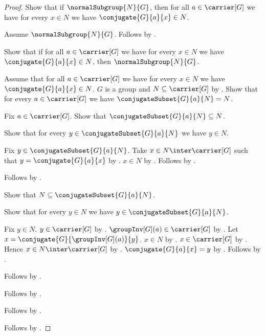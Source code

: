 \begin{proof}
    Show that if $\normalSubgroup{N}{G}$, then
        for all $a\in\carrier[G]$ we have for every $x\in N$ we have
            $\conjugate{G}{a}{x}\in N$.
    \begin{subproof}
        Assume $\normalSubgroup{N}{G}$.
        Follows by .
    \end{subproof}
    Show that if for all $a\in\carrier[G]$ we have for every $x\in N$
        we have $\conjugate{G}{a}{x}\in N$, then
        $\normalSubgroup{N}{G}$.
    \begin{subproof}
        Assume that for all $a\in\carrier[G]$ we have for every $x\in N$
            we have $\conjugate{G}{a}{x}\in N$.
        $G$ is a group and $N\subseteq\carrier[G]$ by
            .
        Show that for every $a\in\carrier[G]$ we have
            $\conjugateSubset{G}{a}{N}=N$.
        \begin{subproof}
            Fix $a\in\carrier[G]$.
            Show that $\conjugateSubset{G}{a}{N}\subseteq N$.
            \begin{subproof}
                Show that for every $y\in\conjugateSubset{G}{a}{N}$
                    we have $y\in N$.
                \begin{subproof}
                    Fix $y\in\conjugateSubset{G}{a}{N}$.
                    Take $x\in N\inter\carrier[G]$ such that
                        $y=\conjugate{G}{a}{x}$ by
                        .
                    $x\in N$ by .
                    Follows by \auto.
                \end{subproof}
                Follows by .
            \end{subproof}
            Show that $N\subseteq\conjugateSubset{G}{a}{N}$.
            \begin{subproof}
                Show that for every $y\in N$ we have
                    $y\in\conjugateSubset{G}{a}{N}$.
                \begin{subproof}
                    Fix $y\in N$.
                    $y\in\carrier[G]$ by .
                    $\groupInv[G](a)\in\carrier[G]$ by
                        .
                    Let $x=\conjugate{G}{\groupInv[G](a)}{y}$.
                    $x\in N$ by \auto.
                    $x\in\carrier[G]$ by
                        .
                    Hence $x\in N\inter\carrier[G]$ by
                        .
                    $\conjugate{G}{a}{x}=y$ by
                        .
                    Follows by .
                \end{subproof}
                Follows by .
            \end{subproof}
            Follows by .
        \end{subproof}
        Follows by .
    \end{subproof}
    Follows by \auto.
\end{proof}


